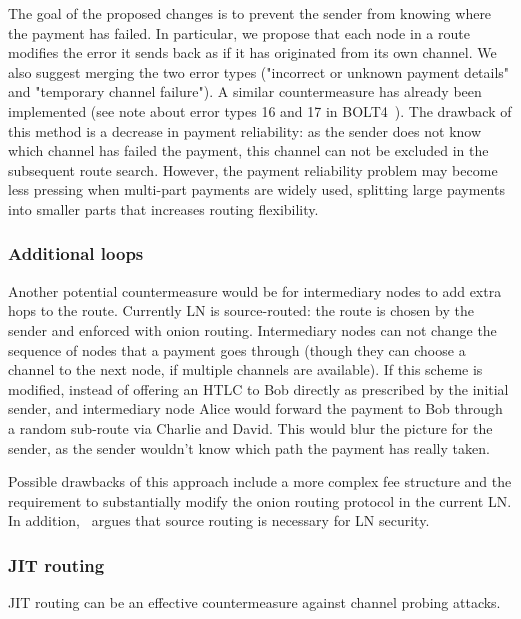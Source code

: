 The goal of the proposed changes is to prevent the sender from knowing where the payment has failed.
In particular, we propose that each node in a route modifies the error it sends back as if it has originated from its own channel.
We also suggest merging the two error types ("incorrect or unknown payment details" and "temporary channel failure").
A similar countermeasure has already been implemented (see note about error types 16 and 17 in BOLT4~\cite{Bolt4OnionRouting}).
The drawback of this method is a decrease in payment reliability: as the sender does not know which channel has failed the payment, this channel can not be excluded in the subsequent route search.
However, the payment reliability problem may become less pressing when multi-part payments are widely used, splitting large payments into smaller parts that increases routing flexibility.

\subsubsection*{Additional loops}
Another potential countermeasure would be for intermediary nodes to add extra hops to the route.
Currently LN is source-routed: the route is chosen by the sender and enforced with onion routing.
Intermediary nodes can not change the sequence of nodes that a payment goes through (though they can choose a channel to the next node, if multiple channels are available).
If this scheme is modified, instead of offering an HTLC to Bob directly as prescribed by the initial sender, and intermediary node Alice would forward the payment to Bob through a random sub-route via Charlie and David.
This would blur the picture for the sender, as the sender wouldn't know which path the payment has really taken.

Possible drawbacks of this approach include a more complex fee structure and the requirement to substantially modify the onion routing protocol in the current LN.
In addition,~\cite{Malavolta2019} argues that source routing is necessary for LN security.

\subsubsection*{JIT routing}
JIT routing can be an effective countermeasure against channel probing attacks.

